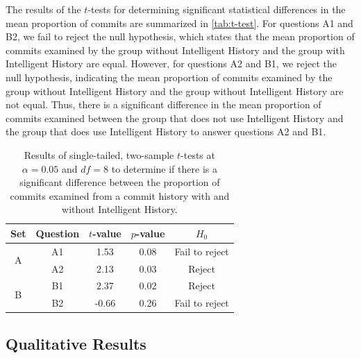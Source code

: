 The results of the $t$-tests for determining significant statistical differences in the mean proportion of commits are summarized in \autoref{tab:t-test}.
For questions A1 and B2, we fail to reject the null hypothesis, which states that the mean proportion of commits examined 
by the group without Intelligent History and the group with Intelligent History are equal.
However, for questions A2 and B1, we reject the null hypothesis, indicating the mean proportion of commits examined 
by the group without Intelligent History and the group without Intelligent History are not equal.
Thus, there is a significant difference in the mean proportion of commits examined between 
the group that does not use Intelligent History and the group that does use Intelligent History to answer questions A2 and B1.

\begin{table}[h]
  \caption{
    Results of single-tailed, two-sample $t$-tests at $\alpha = 0.05$ and $df = 8$ to determine if there is a significant difference between the proportion of commits examined from a commit history
    with and without Intelligent History.
  }
  \centering
  \begin{tabular}{@{}ccccc@{}}
    \toprule
    Set                                     & Question               & \multicolumn{1}{c}{$t$-value} & \multicolumn{1}{c}{$p$-value} & $H_{0}$ \\ \midrule
    \multicolumn{1}{c|}{\multirow{2}{*}{A}} & \multicolumn{1}{c|}{A1} & 1.53                        & 0.08                        & Fail to reject   \\ \cmidrule(l){2-5} 
    \multicolumn{1}{c|}{}                   & \multicolumn{1}{c|}{A2} & 2.13                        & 0.03                        & Reject   \\ \midrule
    \multicolumn{1}{c|}{\multirow{2}{*}{B}} & \multicolumn{1}{c|}{B1} & 2.37                        & 0.02                        & Reject   \\ \cmidrule(l){2-5} 
    \multicolumn{1}{c|}{}                   & \multicolumn{1}{c|}{B2} & -0.66                       & 0.26                        & Fail to reject   \\ \bottomrule
  \end{tabular}
  \label{tab:t-test}
\end{table}

\subsection{Qualitative Results}

